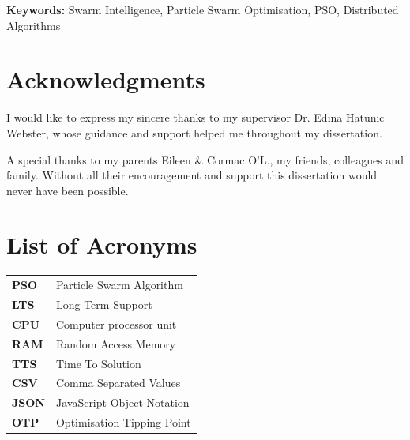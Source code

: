 \documentclass[oneside,12pt]{book}
\begin{document}
\vfill
\noindent
\textbf{Keywords:} \quad Swarm Intelligence, Particle Swarm Optimisation, PSO, Distributed Algorithms

\chapter*{Acknowledgments}

I would like to express my sincere thanks to my supervisor Dr. Edina Hatunic Webster, whose guidance and support helped me throughout my dissertation. 

\vspace{5mm}

{\setlength{\parindent}{0cm}A special thanks to my parents Eileen \& Cormac O'L., my friends, colleagues and family. Without all their encouragement and support this dissertation would never have been possible.}

\newpage
\tableofcontents

\listoffigures

\listoftables

\lstlistoflistings

\chapter*{List of Acronyms}
\begin{table}[H]
  \centering
    \begin{tabular}{ l l }
    \textbf{PSO} & Particle Swarm Algorithm \\
    \textbf{LTS} & Long Term Support \\
    \textbf{CPU} & Computer processor unit \\
    \textbf{RAM} & Random Access Memory \\
    \textbf{TTS} & Time To Solution \\
    \textbf{CSV} & Comma Separated Values \\
    \textbf{JSON} & JavaScript Object Notation \\
    \textbf{OTP} & Optimisation Tipping Point \\
    \end{tabular}
\end{table}

\newpage

\fancyhead[RE,LO]{\leftmark}
\renewcommand{\headrulewidth}{2pt}
\end{document}
